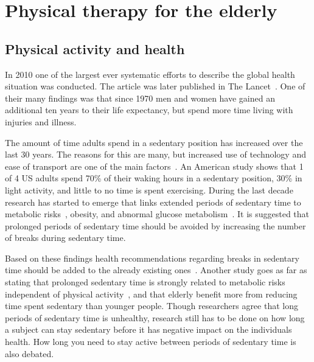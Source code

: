 \chapter{Physical therapy for the elderly}

\section{Physical activity and health}
In 2010 one of the largest ever systematic efforts to describe the global health situation was conducted. The article was later published in The Lancet~\cite{globalBurden}. One of their many findings was that since 1970 men and women have gained an additional ten years to their life expectancy, but spend more time living with injuries and illness. 

The amount of time adults spend in a sedentary position has increased over the last 30 years. The reasons for this are many, but increased use of technology and ease of transport are one of the main factors~\cite{sedentaryBehaviour}. An American study shows that 1 of 4 US adults spend 70\% of their waking hours in a sedentary position, 30\% in light activity, and little to no time is spent exercising. During the last decade research has started to emerge that links extended periods of sedentary time to metabolic risks~\cite{sedentaryTime}, obesity, and abnormal glucose metabolism~\cite{breaksSedentary}. It is suggested that prolonged periods of sedentary time should be avoided by increasing the number of breaks during sedentary time. 

Based on these findings health recommendations regarding breaks in sedentary time should be added to the already existing ones~\cite{breaksSedentary}. Another study goes as far as stating that prolonged sedentary time is strongly related to metabolic risks independent of physical activity~\cite{sedentaryActivity}, and that elderly benefit more from reducing time spent sedentary than younger people. Though researchers agree that long periods of sedentary time is unhealthy, research still has to be done on how long a subject can stay sedentary before it has negative impact on the individuals health. How long you need to stay active between periods of sedentary time is also debated.

